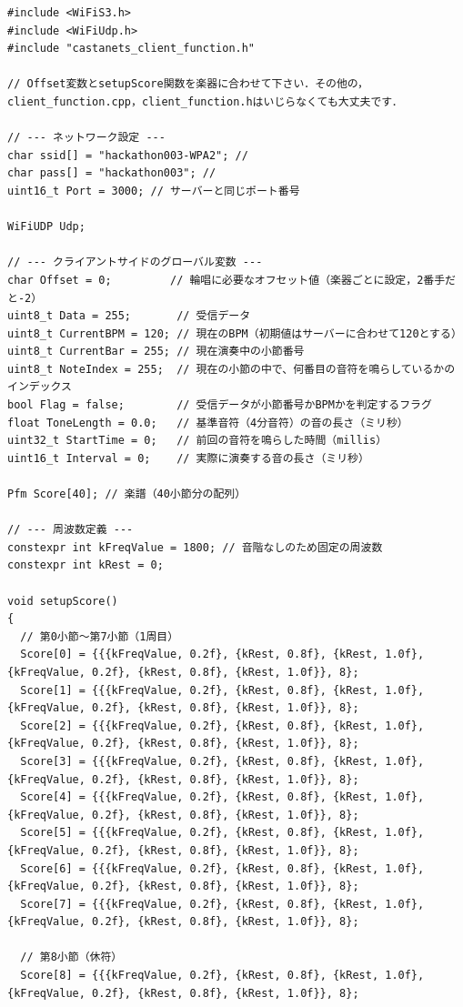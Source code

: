 \begin{lstlisting}
#include <WiFiS3.h>
#include <WiFiUdp.h>
#include "castanets_client_function.h"

// Offset変数とsetupScore関数を楽器に合わせて下さい．その他の，client_function.cpp，client_function.hはいじらなくても大丈夫です．

// --- ネットワーク設定 ---
char ssid[] = "hackathon003-WPA2"; //
char pass[] = "hackathon003"; //
uint16_t Port = 3000; // サーバーと同じポート番号

WiFiUDP Udp;

// --- クライアントサイドのグローバル変数 ---
char Offset = 0;         // 輪唱に必要なオフセット値（楽器ごとに設定，2番手だと-2）
uint8_t Data = 255;       // 受信データ
uint8_t CurrentBPM = 120; // 現在のBPM（初期値はサーバーに合わせて120とする）
uint8_t CurrentBar = 255; // 現在演奏中の小節番号
uint8_t NoteIndex = 255;  // 現在の小節の中で、何番目の音符を鳴らしているかのインデックス
bool Flag = false;        // 受信データが小節番号かBPMかを判定するフラグ
float ToneLength = 0.0;   // 基準音符（4分音符）の音の長さ（ミリ秒）
uint32_t StartTime = 0;   // 前回の音符を鳴らした時間（millis）
uint16_t Interval = 0;    // 実際に演奏する音の長さ（ミリ秒）

Pfm Score[40]; // 楽譜（40小節分の配列）

// --- 周波数定義 ---
constexpr int kFreqValue = 1800; // 音階なしのため固定の周波数
constexpr int kRest = 0;

void setupScore()
{
  // 第0小節〜第7小節（1周目）
  Score[0] = {{{kFreqValue, 0.2f}, {kRest, 0.8f}, {kRest, 1.0f}, {kFreqValue, 0.2f}, {kRest, 0.8f}, {kRest, 1.0f}}, 8};
  Score[1] = {{{kFreqValue, 0.2f}, {kRest, 0.8f}, {kRest, 1.0f}, {kFreqValue, 0.2f}, {kRest, 0.8f}, {kRest, 1.0f}}, 8};
  Score[2] = {{{kFreqValue, 0.2f}, {kRest, 0.8f}, {kRest, 1.0f}, {kFreqValue, 0.2f}, {kRest, 0.8f}, {kRest, 1.0f}}, 8};
  Score[3] = {{{kFreqValue, 0.2f}, {kRest, 0.8f}, {kRest, 1.0f}, {kFreqValue, 0.2f}, {kRest, 0.8f}, {kRest, 1.0f}}, 8};
  Score[4] = {{{kFreqValue, 0.2f}, {kRest, 0.8f}, {kRest, 1.0f}, {kFreqValue, 0.2f}, {kRest, 0.8f}, {kRest, 1.0f}}, 8};
  Score[5] = {{{kFreqValue, 0.2f}, {kRest, 0.8f}, {kRest, 1.0f}, {kFreqValue, 0.2f}, {kRest, 0.8f}, {kRest, 1.0f}}, 8};
  Score[6] = {{{kFreqValue, 0.2f}, {kRest, 0.8f}, {kRest, 1.0f}, {kFreqValue, 0.2f}, {kRest, 0.8f}, {kRest, 1.0f}}, 8};
  Score[7] = {{{kFreqValue, 0.2f}, {kRest, 0.8f}, {kRest, 1.0f}, {kFreqValue, 0.2f}, {kRest, 0.8f}, {kRest, 1.0f}}, 8};

  // 第8小節（休符）
  Score[8] = {{{kFreqValue, 0.2f}, {kRest, 0.8f}, {kRest, 1.0f}, {kFreqValue, 0.2f}, {kRest, 0.8f}, {kRest, 1.0f}}, 8};


\end{lstlisting}
